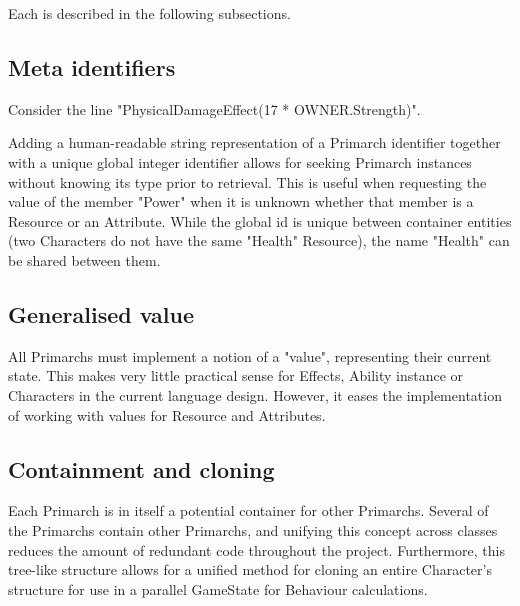 Each is described in the following subsections.

\subsection{Meta identifiers}
Consider the \langname{} line "PhysicalDamageEffect(17 * OWNER.Strength)". 

Adding a human-readable string representation of a Primarch identifier together with a unique global integer identifier allows for seeking Primarch instances without knowing its type prior to retrieval. This is useful when requesting the value of the member "Power" when it is unknown whether that member is a Resource or an Attribute. While the global id is unique between container entities (two Characters do not have the same "Health" Resource), the name "Health" can be shared between them.

\subsection{Generalised value}
All Primarchs must implement a notion of a "value", representing their current state. This makes very little practical sense for Effects, Ability instance or Characters in the current language design. However, it eases the implementation of working with values for Resource and Attributes. 

\subsection{Containment and cloning}
Each Primarch is in itself a potential container for other Primarchs. Several of the Primarchs contain other Primarchs, and unifying this concept across classes reduces the amount of redundant code throughout the project. Furthermore, this tree-like structure allows for a unified method for cloning an entire Character's structure for use in a parallel GameState for Behaviour calculations.

